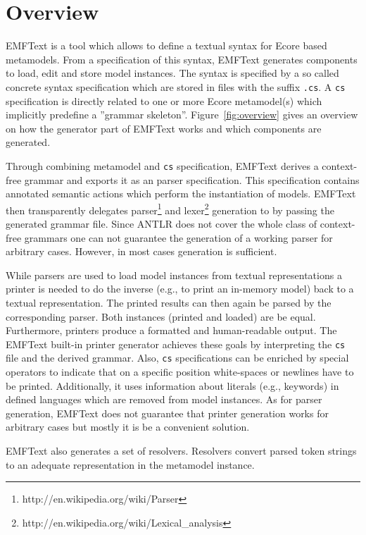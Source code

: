 \chapter{Overview}

EMFText is a tool which allows to define a textual syntax for Ecore based
metamodels. From a specification of this syntax, EMFText generates
components to load, edit and store model instances. The syntax is specified 
by a so called concrete syntax specification which are stored in files with the
suffix \texttt{.cs}. A \texttt{cs} specification is directly related to one or 
more Ecore metamodel(s) which implicitly predefine a ''grammar skeleton''.
Figure~\ref{fig:overview} gives an overview on how the generator part of EMFText
works and which components are generated.


Through combining metamodel and \texttt{cs} specification, EMFText derives a 
context-free grammar and exports it as an \ANTLR parser specification. This
specification contains annotated semantic actions which perform the
instantiation of models. EMFText then transparently delegates
parser\footnote{http://en.wikipedia.org/wiki/Parser} and 
lexer\footnote{http://en.wikipedia.org/wiki/Lexical\_analysis} generation to
\ANTLR by passing the generated grammar file. Since ANTLR does not cover the
whole class of context-free grammars one can not guarantee the generation of a
working parser for arbitrary cases. However, in most cases generation is
sufficient.

While parsers are used to load model instances from textual representations a 
printer is needed to do the inverse (e.g., to print an in-memory model)
back to a textual representation. The printed results can then 
again be parsed by the corresponding parser. Both instances (printed and
loaded) are be equal. Furthermore, printers produce a formatted and
human-readable output. The EMFText built-in printer generator achieves these
goals by interpreting the \texttt{cs} file and the derived grammar. 
Also, \texttt{cs} specifications can be enriched by 
special operators to indicate that on a specific position white-spaces or newlines 
have to be printed. Additionally, it uses information about literals (e.g.,
keywords) in defined languages which are removed from model instances. As for 
parser generation, EMFText does not guarantee that printer generation works for 
arbitrary cases but mostly it is be a convenient solution.

EMFText also generates a set of resolvers. Resolvers convert parsed token
strings to an adequate representation in the metamodel instance.

